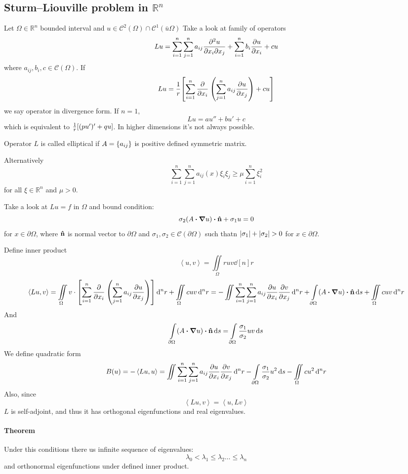 \subsection{Sturm–Liouville problem in $\mathbb{R}^n$}
Let $\Omega \in \mathbb{R}^n$ bounded interval and
$u \in \mathcal{C}^2(\Omega) \cap \mathcal{C}^1(\bar{ u}\Omega)$
Take a look at family of operators
$$Lu = \sum_{i=1}^n \sum_{j=1}^n a_{ij} \pdv{u}{x_i}{x_j} + \sum_{i=1}^n b_i \pdv{u}{x_i} +cu$$
where $a_{ij}, b_i, c \in \mathcal{C}(\Omega)$.
If 
$$Lu = \frac{1}{r} \qty[\sum_{i=1}^n \pdv{x_i}\:\qty(\sum_{j=1}^n a_{ij} \pdv{u}{x_j}) + cu]$$
we say operator in divergence form. 
If $n=1$, 
$$Lu = au'' +bu'+c$$
which is equivalent to $\frac{1}{r}\qty[(pu')'+qu]$. In higher dimensions it's not always possible.


Operator $L$ is called elliptical if $A = \qty{a_{ij}}$ is positive defined symmetric matrix.

Alternatively
$$\sum_{i=1}^n \sum_{j=1}^n a_{ij}(x) \xi_i \xi_j \geq \mu \sum_{i=1}^n \xi_i^2$$ 
for all $\xi \in \mathbb{R}^n$ and $\mu>0$.

Take a look at $Lu = f$ in $\Omega$ and bound condition:
$$\sigma_2 (A \vdot \grad{u}) \vdot \vu{n} + \sigma_1 u = 0$$
for $x\in \partial \Omega$, where $\vu{n}$ is normal vector to $\partial \Omega$ and $\sigma_1, \sigma_2 \in \mathcal{C}(\partial \Omega)$ such thatn $\abs{ \sigma_1}+\abs{ \sigma_2}>0$ for $x\in \partial \Omega$.

Define inner product 
$$\left\langle u,v \right\rangle = \iint\limits_{\Omega} ruv \dd[n]{r}$$
$$\left\langle Lu,v \right\rangle = \iint\limits_{\Omega}v \cdot \qty[\sum_{i=1}^n \pdv{x_i}\:\qty(\sum_{j=1}^n a_{ij} \pdv{u}{x_j})] \dd[n]{r} +\iint\limits_{\Omega} cuv\dd[n]{r} = -\iint \sum_{i=1}^n \sum_{j=1}^n a_{ij} \pdv{u}{x_i} \pdv{v}{x_j} \dd[n]{r} + \int\limits_{\partial \Omega}   (A \vdot \grad{u}) \vdot \vu{n} \dd{s} +\iint\limits_{\Omega} cuv\dd[n]{r} $$
And
$$ \int\limits_{\partial \Omega}   (A \vdot \grad{u}) \vdot \vu{n} \dd{s} = \int\limits_{\partial \Omega}   \frac{\sigma_1}{\sigma_2}uv \dd{s}  $$
We define quadratic form
$$B(u) = -\left\langle Lu,u \right\rangle = \iint \sum_{i=1}^n \sum_{j=1}^n a_{ij} \pdv{u}{x_i} \pdv{v}{x_j} \dd[n]{r} - \int\limits_{\partial \Omega}   \frac{\sigma_1}{\sigma_2}u^2 \dd{s} - \iint\limits_{\Omega} cu^2 \dd[n]{r} $$
Also, since
$$\left\langle Lu,v \right\rangle = \left\langle u,Lv \right\rangle$$
$L$ is self-adjoint, and thus it has orthogonal eigenfunctions and real eigenvalues.
\paragraph{Theorem}
Under this conditions there us infinite sequence of eigenvalues:
$$\lambda_0 < \lambda_1 \leq \lambda_2 \dots \leq \lambda_n$$
and orthonormal eigenfunctions under defined inner product.
